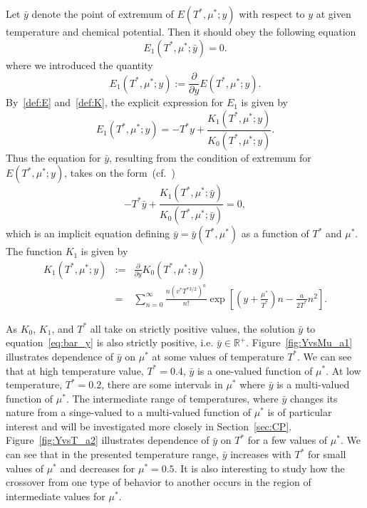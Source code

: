 \documentclass[12pt]{article}
\numberwithin{equation}{section}
\begin{document}
	Let $\bar{y}$ denote the point of extremum of $E(T^*,\mu^*;y)$ with respect to $y$ at given temperature and chemical potential. Then it should obey the following equation
	\begin{equation}
		\label{cond:extr}
		E_1(T^*,\mu^*;\bar{y}) = 0.
	\end{equation}
	where we introduced the quantity
	\begin{equation}
		\label{def:E1}
		E_1(T^*,\mu^*;y) := \frac{\partial}{\partial y} E(T^*,\mu^*;y).
	\end{equation}
	By~\eqref{def:E} and~\eqref{def:K}, the explicit expression for $E_1$ is given by
	\begin{equation}
		\label{def:reducedE1}
		E_1(T^*,\mu^*;y) = -T^* y + \frac{K_1(T^*,\mu^*;y)}{K_0(T^*,\mu^*;y)}.
	\end{equation}
	Thus the equation for $\bar{y}$, resulting from the condition of extremum for $E(T^*,\mu^*;y)$, takes on the form~(cf.~\cite[(2.19)]{KKD20})
	\begin{equation}
		\label{eq:bar_y}
		-T^* \bar{y} + \frac{K_1(T^*,\mu^*;\bar{y})}{K_0(T^*,\mu^*;\bar{y})} = 0,
	\end{equation}
	which is an implicit equation defining $\bar{y} = \bar{y}(T^*,\mu^*)$ as a function of $T^*$ and $\mu^*$.
	The function $K_1$ is given by
	\begin{eqnarray}
		K_1(T^*,\mu^*;y) & := & \frac{\partial}{\partial y} K_0(T^*,\mu^*;y)
		\nonumber\\
		& = & \sum_{n=0}^{\infty} \frac{n (v^* T^{*3/2})^n}{n!} \exp[\left(y+\frac{\mu^*}{T^*}\right)n - \frac{a}{2T^*}n^2].
	\end{eqnarray}
	
	As $K_0$, $K_1$, and $T^*$ all take on strictly positive values, the solution $\bar{y}$ to equation~\eqref{eq:bar_y} is also strictly positive, i.e. $\bar{y} \in \mathbb{R}^{+}$.
	Figure~\ref{fig:YvsMu_a1} illustrates dependence of $\bar{y}$ on $\mu^*$ at some values of temperature $T^*$. We can see that at high temperature value, $T^*=0.4$, $\bar{y}$ is a one-valued function of $\mu^*$. At low temperature, $T^*=0.2$, there are some intervals in $\mu^*$ where $\bar{y}$ is a multi-valued function of $\mu^*$. The intermediate range of temperatures, where $\bar{y}$ changes its nature from a singe-valued to a multi-valued function of $\mu^*$ is of particular interest and will be investigated more closely in Section~\ref{sec:CP}. Figure~\ref{fig:YvsT_a2} illustrates dependence of $\bar{y}$ on $T^*$ for a few values of $\mu^*$. We can see that in the presented temperature range, $\bar{y}$ increases with $T^*$ for small values of $\mu^*$ and decreases for $\mu^*=0.5$. It is also interesting to study how the crossover from one type of behavior to another occurs in the region of intermediate values for $\mu^*$.
	
\end{document}

